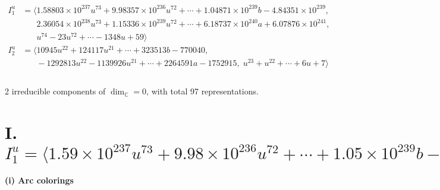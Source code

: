 \documentclass[1p]{elsarticle_modified}
\theoremstyle{definition}
\begin{document}
\begin{align*}
I^u_{1}&=\langle 
1.58803\times10^{237} u^{73}+9.98357\times10^{236} u^{72}+\cdots+1.04871\times10^{239} b-4.84351\times10^{239},\\
\phantom{I^u_{1}}&\phantom{= \langle  }2.36054\times10^{238} u^{73}+1.15336\times10^{239} u^{72}+\cdots+6.18737\times10^{240} a+6.07876\times10^{241},\\
\phantom{I^u_{1}}&\phantom{= \langle  }u^{74}-23 u^{72}+\cdots-1348 u+59\rangle \\
I^u_{2}&=\langle 
10945 u^{22}+124117 u^{21}+\cdots+323513 b-770040,\\
\phantom{I^u_{2}}&\phantom{= \langle  }-1292813 u^{22}-1139926 u^{21}+\cdots+2264591 a-1752915,\;u^{23}+u^{22}+\cdots+6 u+7\rangle \\
\\
\end{align*}
\raggedright * 2 irreducible components of $\dim_{\mathbb{C}}=0$, with total 97 representations.\\
\newpage
\renewcommand{\arraystretch}{1}
\centering \section*{I. $I^u_{1}= \langle 1.59\times10^{237} u^{73}+9.98\times10^{236} u^{72}+\cdots+1.05\times10^{239} b-4.84\times10^{239},\;2.36\times10^{238} u^{73}+1.15\times10^{239} u^{72}+\cdots+6.19\times10^{240} a+6.08\times10^{241},\;u^{74}-23 u^{72}+\cdots-1348 u+59 \rangle$}
\flushleft \textbf{(i) Arc colorings}\\
\end{document}
